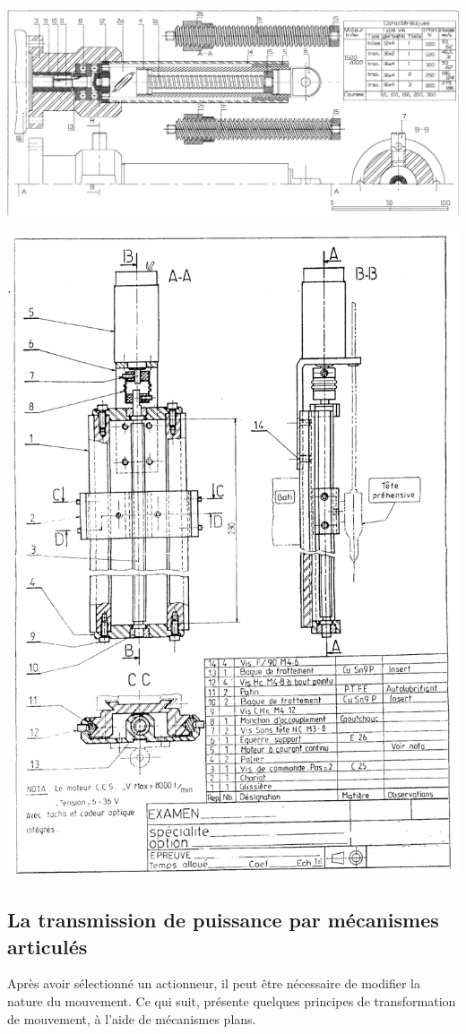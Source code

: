 \documentclass[11pt,oneside]{article}
\begin{document}
\begin{center}
\includegraphics[width=\textwidth]{png/fig_111}
\end{center}

\begin{center}
\includegraphics[width=.8\textwidth]{png/fig_112}
\end{center}

\subsection{La transmission de puissance par mécanismes articulés}
Après avoir sélectionné un actionneur, il peut être nécessaire de modifier la nature du mouvement.
Ce qui suit, présente quelques principes de transformation de mouvement, à l’aide de mécanismes plans.
\end{document}
